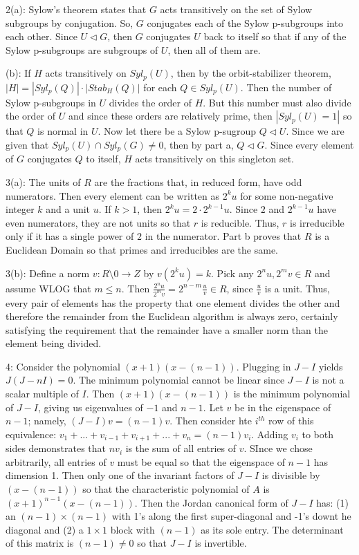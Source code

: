 \documentclass[12pt]{article}
\begin{document}
2(a): Sylow's theorem states that $G$ acts transitively on the set of Sylow subgroups by conjugation. So, $G$ conjugates each of the Sylow p-subgroups into each other. Since $U \triangleleft G$, then $G$ conjugates $U$ back to itself so that if any of the Sylow p-subgroups are subgroups of $U$, then all of them are. \newline

(b): If $H$ acts transitively on $Syl_p(U)$, then by the orbit-stabilizer theorem, $|H|=|Syl_p(Q)| \cdot |Stab_H(Q)|$ for each $Q \in Syl_p(U)$. Then the number of Sylow p-subgroups in $U$ divides the order of $H$. But this number must also divide the order of $U$ and since these orders are relatively prime, then $|Syl_p(U)=1|$ so that $Q$ is normal in $U$. Now let there be a Sylow p-sugroup $Q \triangleleft U$. Since we are given that $Syl_p(U) \cap Syl_p(G) \neq 0$, then by part a, $Q \triangleleft G$. Since every element of $G$ conjugates $Q$ to itself, $H$ acts transitively on this singleton set. \newline

3(a): The units of $R$ are the fractions that, in reduced form, have odd numerators. Then every element can be written as $2^ku$ for some non-negative integer $k$ and a unit $u$. If $k>1$, then $2^ku=2 \cdot 2^{k-1}u$. Since $2$ and $2^{k-1}u$ have even numerators, they are not units so that $r$ is reducible. Thus, $r$ is irreducible only if it has a single power of $2$ in the numerator. Part b proves that $R$ is a Euclidean Domain so that primes and irreducibles are the same. \newline

3(b): Define a norm $v:R \setminus {0} \rightarrow Z$ by $v(2^ku)=k$. Pick any $2^nu,2^mv \in R$ and assume WLOG that $m\leq n$. Then $\frac{2^nu}{2^mv}=2^{n-m}\frac{u}{v} \in R$, since $\frac{u}{v}$ is a unit. Thus, every pair of elements has the property that one element divides the other and therefore the remainder from the Euclidean algorithm is always zero, certainly satisfying the requirement that the remainder have a smaller norm than the element being divided. \newline

4: Consider the polynomial $(x+1)(x-(n-1))$. Plugging in $J-I$ yields $J(J-nI)=0$. The minimum polynomial cannot be linear since $J-I$ is not a scalar multiple of $I$. Then $(x+1)(x-(n-1))$ is the minimum polynomial of $J-I$, giving us eigenvalues of $-1$ and $n-1$. Let $v$ be in the eigenspace of $n-1$; namely, $(J-I)v=(n-1)v$. Then consider hte $i^{th}$ row of this equivalence: $v_1+...+v_{i-1}+v_{i+1}+...+v_n=(n-1)v_i$. Adding $v_i$ to both sides demonstrates that $nv_i$ is the sum of all entries of $v$. SInce we chose arbitrarily, all entries of $v$ must be equal so that the eigenspace of $n-1$ has dimension 1. Then only one of the invariant factors of $J-I$ is divisible by $(x-(n-1))$ so that the characteristic polynomial of $A$ is $(x+1)^{n-1}(x-(n-1))$. Then the Jordan canonical form of $J-I$ has: (1) an $(n-1) \times (n-1)$ with 1's along the first super-diagonal and -1's downt he diagonal and (2) a $1 \times 1$ block with $(n-1)$ as its sole entry. The determinant of this matrix is $(n-1) \neq 0$ so that $J-I$ is invertible. \newline
\end{document}
